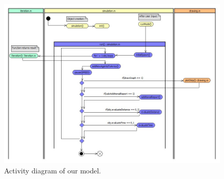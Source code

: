 \begin{figure}[h!]
	\centering
		\includegraphics[width=1.0\textwidth]{pictures/activityDiagram}
	\caption{Activity diagram of our model.}
	\label{fig:activityDiagram}
\end{figure}

